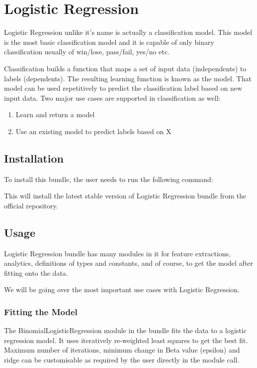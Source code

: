 \chapter{Logistic Regression}\label{supe:logreg}

Logistic Regression unlike it's name is actually a classification model. This model is the most basic classification model and it is capable of only binary classification usually of win/lose, pass/fail, yes/no etc.

Classification builds a function that maps a set of input data (independents) to labels (dependents). The resulting learning function is known as the model. That model can be used repetitively to predict the classification label based on new input data. Two major use cases are supported in classification as well:

\begin{enumerate}
    \item Learn and return a model
    \item Use an existing model to predict labels based on X
\end{enumerate}

\section{Installation}

To install this bundle, the user needs to run the following command:



This will install the latest stable version of Logistic Regression bundle from the official repository.

\section{Usage}

Logistic Regression bundle has many modules in it for feature extractions, analytics, definitions of types and constants, and of course, to get the model after fitting onto the data.

We will be going over the most important use cases with Logistic Regression.

\subsection{Fitting the Model}

The BinomialLogisticRegression module in the bundle fits the data to a logistic regression model. It uses iteratively re-weighted least squares to get the best fit. Maximum number of iterations, minimum change in Beta value (epsilon) and ridge can be customisable as required by the user directly in the module call.

